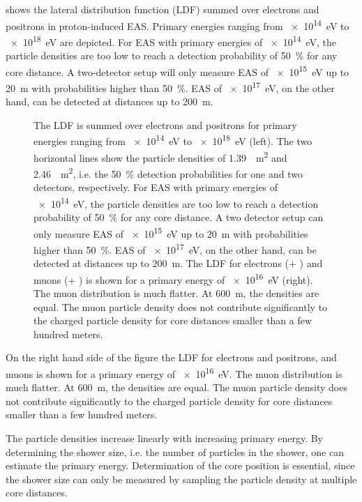  shows the lateral distribution function (LDF) summed
over electrons and positrons in proton-induced EAS. Primary energies ranging
from \SI{e14}{\electronvolt} to \SI{e18}{\electronvolt} are depicted. For EAS
with primary energies of \SI{e14}{\electronvolt}, the particle densities are too
low to reach a detection probability of \SI{50}{\percent} for any core distance.
A two-detector setup will only measure EAS of \SI{e15}{\electronvolt} up to
\SI{20}{\meter} with probabilities higher than \SI{50}{\percent}. EAS of
\SI{e17}{\electronvolt}, on the other hand, can be detected at distances up to
\SI{200}{\meter}.
\begin{figure}
\centering
{

}
\caption{ The LDF is summed over electrons and positrons for primary energies
ranging from \SI{e14}{\electronvolt} to \SI{e18}{\electronvolt} (left).  The two
horizontal lines show the particle densities of \SI{1.39}{\per\square\meter} and
\SI{2.46}{\per\square\meter}, i.e. the \SI{50}{\percent} detection probabilities
for one and two detectors, respectively.  For EAS with primary energies of
\SI{e14}{\electronvolt}, the particle densities are too low to reach a detection
probability of \SI{50}{\percent} for any core distance. A two detector setup can
only measure EAS of \SI{e15}{\electronvolt} up to \SI{20}{\meter} with
probabilities higher than \SI{50}{\percent}. EAS of \SI{e17}{\electronvolt}, on
the other hand, can be detected at distances up to \SI{200}{\meter}. The
LDF for electrons (\Pelectron + \Ppositron{\unsansmath$^+$}) and muons
(\Pmuon + \APmuon{\unsansmath$^+$}) is
shown for a primary energy of \SI{e16}{\electronvolt} (right).  The muon
distribution is much flatter. At \SI{600}{\meter}, the densities are equal.
The muon particle density does not contribute significantly to the charged
particle density for core distances smaller than a few hundred meters.}
\label{fig:ldf-threshold}
\end{figure}
On the right hand side of the figure the LDF for electrons and positrons, and
muons is shown for a primary energy of \SI{e16}{\electronvolt}.  The muon
distribution is much flatter. At \SI{600}{\meter}, the densities are equal.
The muon particle density does not contribute significantly to the charged
particle density for core distances smaller than a few hundred
meters.

The particle densities increase linearly with increasing primary energy.  By
determining the shower size, i.e. the number of particles in the shower, one can
estimate the primary energy.  Determination of the core position is essential,
since the shower size can only be measured by sampling the particle density at
multiple core distances.

